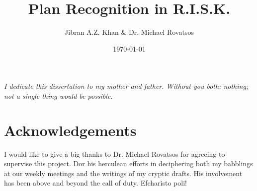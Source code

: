 \documentclass[parskip]{cs4rep}
\begin{document}
\title{Plan Recognition in R.I.S.K.}

\author{Jibran A.Z. Khan \& Dr. Michael Rovatsos}



\date{\today}


\maketitle

\newpage

\begin{center}
\textit{I dedicate this dissertation to my mother and father. Without you both; nothing; not a single thing would be possible.}
\end{center}

\newpage

\section*{Acknowledgements}

I would like to give a big thanks to Dr. Michael Rovatsos for agreeing to supervise this project. Dor his herculean efforts in deciphering both my babblings at our weekly meetings and the writings of my cryptic drafts. His involvement has been above and beyond the call of duty. Efcharisto poli!
\end{document}
